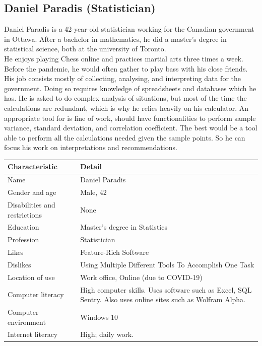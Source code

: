 \documentclass[11pt,onside]{report}
\begin{document}
\subsection{Daniel Paradis (Statistician)}
Daniel Paradis is a 42-year-old statistician working for the Canadian government in Ottawa. After a bachelor in mathematics, he did a master’s degree in statistical science, both at the university of Toronto. \\

He enjoys playing Chess online and practices martial arts three times a week. Before the pandemic, he would often gather to play bass with his close friends.  \\

His job consists mostly of collecting, analysing, and interpreting data for the government. Doing so requires knowledge of spreadsheets and databases which he has. He is asked to do complex analysis of situations, but most of the time the calculations are redundant, which is why he relies heavily on his calculator. An appropriate tool for is line of work, should have functionalities to perform sample variance, standard deviation, and correlation coefficient. The best would be a tool able to perform all the calculations needed given the sample points. So he can focus his work on interpretations and recommendations.
\begin{center}
    \begin{tabular}{|p{4cm}|p{10cm}|}
        \hline
        \bf{Characteristic} & \bf{Detail} \\
        \hline
        Name &   Daniel Paradis \\
        \hline
        Gender and age & Male, 42 \\
        \hline
        Disabilities and restrictions & None \\
        \hline
        Education & Master's degree in Statistics \\
        \hline
        Profession & Statistician \\
        \hline
        Likes & Feature-Rich Software \\
        \hline
        Dislikes & Using Multiple Different Tools To Accomplish One Task \\
        \hline
        Location of use & Work office, Online (due to COVID-19) \\
        \hline
        Computer literacy & High computer skills. Uses software such as Excel, SQL Sentry. Also uses online sites such as Wolfram Alpha. \\
        \hline
        Computer environment &  Windows 10 \\
        \hline
        Internet literacy &  High; daily work. \\
        \hline
    \end{tabular}
\end{center}
\end{document}
